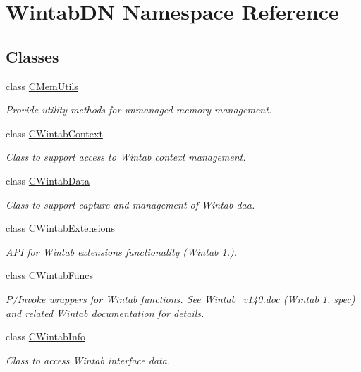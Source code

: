 \hypertarget{namespace_wintab_d_n}{}\section{Wintab\+DN Namespace Reference}
\label{namespace_wintab_d_n}
\subsection*{Classes}
\begin{DoxyCompactItemize}
\item 
class \mbox{\hyperlink{class_wintab_d_n_1_1_c_mem_utils}{C\+Mem\+Utils}}
\begin{DoxyCompactList}\small\item\em Provide utility methods for unmanaged memory management. \end{DoxyCompactList}\item 
class \mbox{\hyperlink{class_wintab_d_n_1_1_c_wintab_context}{C\+Wintab\+Context}}
\begin{DoxyCompactList}\small\item\em Class to support access to Wintab context management. \end{DoxyCompactList}\item 
class \mbox{\hyperlink{class_wintab_d_n_1_1_c_wintab_data}{C\+Wintab\+Data}}
\begin{DoxyCompactList}\small\item\em Class to support capture and management of Wintab daa. \end{DoxyCompactList}\item 
class \mbox{\hyperlink{class_wintab_d_n_1_1_c_wintab_extensions}{C\+Wintab\+Extensions}}
\begin{DoxyCompactList}\small\item\em A\+PI for Wintab extensions functionality (Wintab 1.). \end{DoxyCompactList}\item 
class \mbox{\hyperlink{class_wintab_d_n_1_1_c_wintab_funcs}{C\+Wintab\+Funcs}}
\begin{DoxyCompactList}\small\item\em P/\+Invoke wrappers for Wintab functions. See Wintab\+\_\+v140.\+doc (Wintab 1. spec) and related Wintab documentation for details. \end{DoxyCompactList}\item 
class \mbox{\hyperlink{class_wintab_d_n_1_1_c_wintab_info}{C\+Wintab\+Info}}
\begin{DoxyCompactList}\small\item\em Class to access Wintab interface data. \end{DoxyCompactList}\item 

\end{DoxyCompactItemize}
